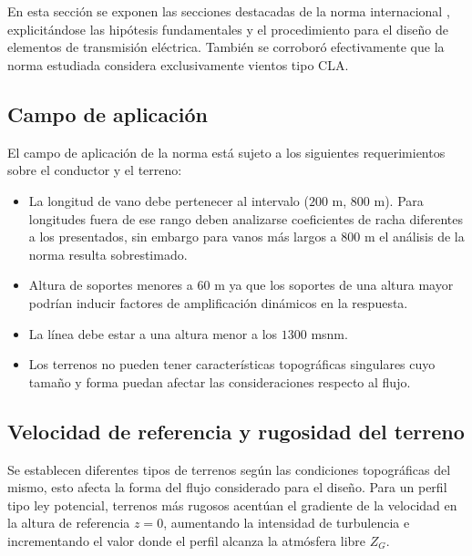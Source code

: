 \chapter{}\label{Ape2}

En esta sección se exponen las secciones destacadas de la norma internacional \cite{IEC60826}, explicitándose las hipótesis fundamentales y el procedimiento para el diseño de elementos de transmisión eléctrica. También se corroboró efectivamente que la norma estudiada considera exclusivamente vientos tipo CLA.

\section{Campo de aplicación}
El campo de aplicación de la norma está sujeto a los siguientes requerimientos sobre el conductor y el terreno:

\begin{itemize}
	\item La longitud de vano debe pertenecer al intervalo ($200$ m, $800$ m). Para longitudes fuera de ese rango deben analizarse coeficientes de racha diferentes a los presentados, sin embargo para vanos más largos a $800$ m el análisis de la norma resulta sobrestimado.
	\item Altura de soportes menores a $60$ m ya que los soportes de una altura mayor podrían inducir factores de amplificación dinámicos en la respuesta.
	\item La línea debe estar a una altura menor a los $1300$ msnm.
	\item Los terrenos no pueden tener características topográficas singulares cuyo tamaño y forma puedan afectar las consideraciones respecto al flujo.
\end{itemize}

\section{Velocidad de referencia y rugosidad del terreno}
Se establecen diferentes tipos de terrenos según las condiciones topográficas del mismo, esto afecta la forma del flujo considerado para el diseño. Para un perfil tipo ley potencial, terrenos más rugosos acentúan el gradiente de la velocidad en la altura de referencia $z=0$,  aumentando la intensidad de turbulencia e incrementando el valor donde el perfil alcanza la atmósfera libre $Z_G$.

